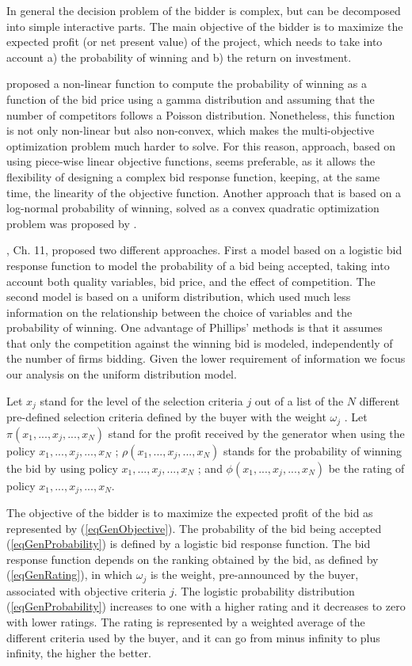 \documentclass[informs]{informs3}
\begin{document}
In general the decision problem of the bidder is complex, but can be decomposed into simple interactive parts. The main objective of the bidder is to maximize the expected profit (or net present value) of the project, which needs to take into account a) the probability of winning and b) the return on investment. 


\cite{Chen_1989} proposed a non-linear function to compute the probability of winning as a function of the bid price using a gamma distribution and assuming that the number of competitors follows a Poisson distribution. Nonetheless, this function is not only non-linear but also non-convex, which makes the multi-objective optimization problem much harder to solve. For this reason,  approach, based on using piece-wise linear objective functions, seems preferable, as it allows the flexibility of designing a complex bid response function, keeping, at the same time, the linearity of the objective function. Another approach that is based on a log-normal probability of winning, solved as a convex quadratic optimization problem was proposed by . 

, Ch. 11, proposed two different approaches. First a model based on a logistic bid response function to model the probability of a bid being accepted, taking into account both quality variables, bid price, and the effect of competition. The second model is based on a uniform distribution, which used much less information on the relationship between the choice of variables and the probability of winning. One advantage of Phillips’ methods is that it assumes that only the competition against the winning bid is modeled, independently of the number of firms bidding. Given the lower requirement of information we focus our analysis on the uniform distribution model.  

Let $x_j$  stand for the level of the selection criteria $j$ out of a list of the $N$ different pre-defined selection criteria defined by the buyer with the weight $\omega_j$  . Let $\pi(x_1, ..., x_j, ..., x_N)$ stand for the profit received by the generator when using the policy $x_1, ..., x_j, ..., x_N$ ; $\rho(x_1, ..., x_j, ..., x_N)$  stands for the probability of winning the bid by using policy $x_1, ..., x_j, ..., x_N$ ; and $\phi(x_1, ..., x_j, ..., x_N)$  be the rating of policy $x_1, ..., x_j, ..., x_N$.       

The objective of the bidder is to maximize the expected profit of the bid as represented by (\ref{eqGenObjective}). The probability of the bid being accepted (\ref{eqGenProbability}) is defined by a logistic bid response function. The bid response function depends on the ranking  obtained by the bid, as defined by (\ref{eqGenRating}), in which $\omega_j$  is the weight, pre-announced by the buyer, associated with objective criteria $j$. The logistic probability distribution (\ref{eqGenProbability}) increases to one with a higher rating and it decreases to zero with lower ratings. The rating is represented by a weighted average of the different criteria used by the buyer, and it can go from minus infinity to plus infinity, the higher the better.
\end{document}

